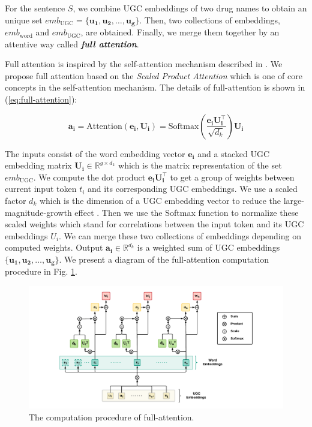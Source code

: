 \documentclass[conference]{IEEEtran}
\begin{document}
For the sentence $S$, we combine UGC embeddings of two drug names to obtain an unique set $emb_{\text{UGC}} = \{ \bm{u_1}, \bm{u_2}, \dots, \bm{u_g}\}$.
Then, two collections of embeddings, $emb_{\text{word}}$ and $emb_{\text{UGC}}$, are obtained.
Finally, we merge them together by an attentive way called \textbf{\emph{full attention}}.

Full attention is inspired by the self-attention mechanism described in \cite{vaswani_attention_2017}.
We propose full attention based on the \emph{Scaled Product Attention} which is one of core concepts in the self-attention mechanism.
The details of full-attention is shown in (\ref{eq:full-attention}):

\begin{equation}
\label{eq:full-attention}
\bm{a_i} = \text{Attention}(\bm{e_i}, \bm{U_i}) = \text{Softmax}\left ( \frac{\bm{e_i} \bm{U_i^{\top}}}{\sqrt{d_k}} \right ) \bm{U_i}
\end{equation}

\noindent The inputs consist of the word embedding vector $\bm{e_i}$ and a stacked UGC embedding matrix $\bm{U_i} \in \mathbb{R}^{g \times d_k}$ which is the matrix representation of the set $emb_{\text{UGC}}$.
We compute the dot product $\bm{e_i} \bm{U_i^{\top}}$ to get a group of weights between current input token
$t_i$ and its corresponding UGC embeddings.
We use a scaled factor $d_k$ which is the dimension of a UGC embedding vector to reduce the
large-magnitude-growth effect \cite{vaswani_attention_2017}.
Then we use the Softmax function to normalize these scaled weights which stand for correlations between the input token and its UGC embeddings $U_i$.
We can merge these two collections of embeddings depending on computed weights.
Output $\bm{a_i} \in \mathbb{R}^{d_k}$ is a weighted sum of UGC embeddings $\{\bm{u_1}, \bm{u_2}, \dots, \bm{u_g}\}$.
We present a diagram of the full-attention computation procedure in Fig. \ref{fig:full-attention}.

\begin{figure}[ht]
	\centering
	\includegraphics[scale=0.85]{figures/full-attention}
	\caption{The computation procedure of full-attention.}
	\label{fig:full-attention}
\end{figure}
\end{document}
